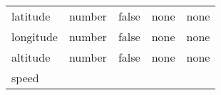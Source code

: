 \documentclass[
]{article}
\begin{document}
\begin{longtable}[]{@{}lllll@{}}
\begin{minipage}[t]{0.17\columnwidth}\raggedright
latitude\strut
\end{minipage} & \begin{minipage}[t]{0.17\columnwidth}\raggedright
number\strut
\end{minipage} & \begin{minipage}[t]{0.17\columnwidth}\raggedright
false\strut
\end{minipage} & \begin{minipage}[t]{0.17\columnwidth}\raggedright
none\strut
\end{minipage} & \begin{minipage}[t]{0.17\columnwidth}\raggedright
none\strut
\end{minipage}\tabularnewline
\begin{minipage}[t]{0.17\columnwidth}\raggedright
longitude\strut
\end{minipage} & \begin{minipage}[t]{0.17\columnwidth}\raggedright
number\strut
\end{minipage} & \begin{minipage}[t]{0.17\columnwidth}\raggedright
false\strut
\end{minipage} & \begin{minipage}[t]{0.17\columnwidth}\raggedright
none\strut
\end{minipage} & \begin{minipage}[t]{0.17\columnwidth}\raggedright
none\strut
\end{minipage}\tabularnewline
\begin{minipage}[t]{0.17\columnwidth}\raggedright
altitude\strut
\end{minipage} & \begin{minipage}[t]{0.17\columnwidth}\raggedright
number\strut
\end{minipage} & \begin{minipage}[t]{0.17\columnwidth}\raggedright
false\strut
\end{minipage} & \begin{minipage}[t]{0.17\columnwidth}\raggedright
none\strut
\end{minipage} & \begin{minipage}[t]{0.17\columnwidth}\raggedright
none\strut
\end{minipage}\tabularnewline
\begin{minipage}[t]{0.17\columnwidth}\raggedright
speed\strut
\end{minipage} & \begin{minipage}[t]{0.17\columnwidth}\raggedright

\end{minipage}
\end{longtable}
\end{document}
